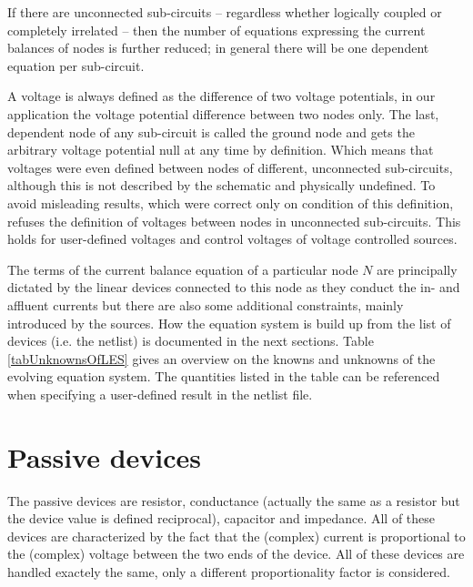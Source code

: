 If there are unconnected sub-circuits -- regardless whether logically
coupled or completely irrelated -- then the number of equations expressing
the current balances of nodes is further reduced; in general there will be
one dependent equation per sub-circuit.

A voltage is always defined as the difference of two voltage potentials,
in our application the voltage potential difference between two nodes
only. The last, dependent node of any sub-circuit is called the ground
node and gets the arbitrary voltage potential null at any time by
definition. Which means that voltages were even defined between nodes of
different, unconnected sub-circuits, although this is not described by the
schematic and physically undefined. To avoid misleading results, which
were correct only on condition of this definition, \linnet{} refuses the
definition of voltages between nodes in unconnected sub-circuits. This
holds for user-defined voltages and control voltages of voltage controlled
sources.

The terms of the current balance equation of a particular node $N$ are
principally dictated by the linear devices connected to this node as they
conduct the in- and affluent currents but there are also some additional
constraints, mainly introduced by the sources. How the equation system is
build up from the list of devices (i.e. the netlist) is documented in the
next sections. Table \ref{tabUnknownsOfLES} gives an overview on the
knowns and unknowns of the evolving equation system. The quantities listed
in the table can be referenced when specifying a user-defined result in
the netlist file.


\section{Passive devices}

The passive devices are resistor, conductance (actually the same as a
resistor but the device value is defined reciprocal), capacitor and
impedance. All of these devices are characterized by the fact that the
(complex) current is proportional to the (complex) voltage between the two
ends of the device. All of these devices are handled exactely the same,
only a different proportionality factor is considered.

